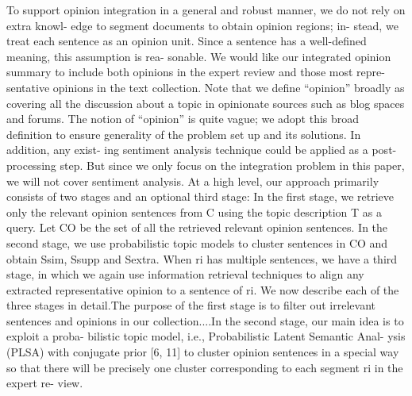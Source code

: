 \documentclass[runningheads,a4paper]{llncs}
\begin{document}
To support opinion integration in a general and robust manner, we do not rely on extra knowl- edge to segment documents to obtain opinion regions; in- stead, we treat each sentence as an opinion unit. Since a sentence has a well-defined meaning, this assumption is rea- sonable. We would like our integrated opinion summary to include both opinions in the expert review and those most repre- sentative opinions in the text collection. 
Note that we define “opinion” broadly as covering all the
discussion about a topic in opinionate sources such as blog spaces and forums. The notion of “opinion” is quite vague; we adopt this broad definition to ensure generality of the problem set up and its solutions. In addition, any exist- ing sentiment analysis technique could be applied as a post- processing step. But since we only focus on the integration problem in this paper, we will not cover sentiment analysis.
At a high level, our approach primarily consists of two stages and an optional third stage: In the first stage, we
retrieve only the relevant opinion sentences from C using the topic description T as a query. Let CO be the set of all the retrieved relevant opinion sentences. In the second stage, we use probabilistic topic models to cluster sentences
in CO and obtain Ssim, Ssupp and Sextra. When ri has multiple sentences, we have a third stage, in which we again use information retrieval techniques to align any extracted representative opinion to a sentence of ri. We now describe each of the three stages in detail.The purpose of the first stage is to filter out irrelevant
sentences and opinions in our collection....In the second stage, our main idea is to exploit a proba-
bilistic topic model, i.e., Probabilistic Latent Semantic Anal- ysis (PLSA) with conjugate prior [6, 11] to cluster opinion sentences in a special way so that there will be precisely one cluster corresponding to each segment ri in the expert re- view.
\end{document}
